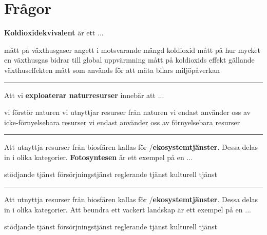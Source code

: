 \documentclass{exam}
\begin{document}
\section*{Frågor}

\begin{questions}

\question \textbf{Koldioxidekvivalent} är ett ... 
\begin{checkboxes}
    \CorrectChoice mått på växthusgaser angett i motsvarande mängd koldioxid
    \choice mått på hur mycket en växthusgas bidrar till global uppvärmning
    \choice mått på koldioxids effekt gällande växthuseffekten
    \choice mått som används för att mäta bilars miljöpåverkan
\end{checkboxes}

\vspace{5mm} \hrule \vspace{5mm}

\question Att vi \textbf{exploaterar naturresurser} innebär att ... 
\begin{checkboxes}
    \choice vi förstör naturen
    \CorrectChoice vi utnyttjar resurser från naturen
    \choice vi endast använder oss av icke-förnyelsebara resurser
    \choice vi endast använder oss av förnyelsebara resurser
\end{checkboxes}

\vspace{5mm} \hrule \vspace{5mm}

\question Att utnyttja resurser från biosfären kallas för /\textbf{ekosystemtjänster}. Dessa delas in i olika kategorier. \textbf{Fotosyntesen} är ett exempel på en ...
\begin{checkboxes}
    \CorrectChoice stödjande tjänst
    \choice försörjningstjänst
    \choice reglerande tjänst
    \choice kulturell tjänst
\end{checkboxes}

\vspace{5mm} \hrule \vspace{5mm}

\question Att utnyttja resurser från biosfären kallas för /\textbf{ekosystemtjänster}. Dessa delas in i olika kategorier. Att beundra ett vackert landskap är ett exempel på en ... 
\begin{checkboxes}
    \choice stödjande tjänst
    \choice försörjningstjänst
    \choice reglerande tjänst
    \CorrectChoice kulturell tjänst
\end{checkboxes}


\end{questions}
\end{document}
